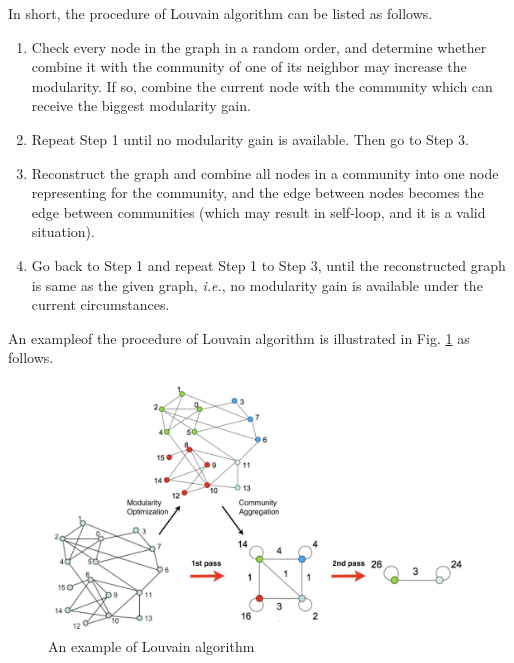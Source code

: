 \documentclass[12pt, a4paper]{article}
\theoremstyle{definition}
\begin{document}
In short, the procedure of Louvain algorithm can be listed as follows.

\begin{enumerate}
	\item[\textbf{Step 1}.] Check every node in the graph in a random order, and determine whether combine it with the community of one of its neighbor may increase the modularity. If so, combine the current node with the community which can receive the biggest modularity gain.
	\item[\textbf{Step 2}.] Repeat Step 1 until no modularity gain is available. Then go to Step 3. 
	\item[\textbf{Step 3}.] Reconstruct the graph and combine all nodes in a community into one node representing for the community, and the edge between nodes becomes the edge between communities (which may result in self-loop, and it is a valid situation).
	\item[\textbf{Step 4}.] Go back to Step 1 and repeat Step 1 to Step 3, until the reconstructed graph is same as the given graph, \textit{i.e.}, no modularity gain is available under the current circumstances. 
\end{enumerate}

An example\footnotemark[1] of the procedure of Louvain algorithm is illustrated in Fig. \ref{fig1} as follows.

\begin{figure}[htbp]
	\centering
	\includegraphics[width=4.5in]{1.png}
	\caption{An example of Louvain algorithm}
	\label{fig1}
\end{figure}

\end{document}
